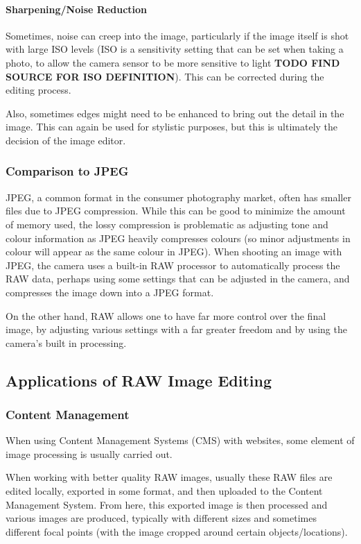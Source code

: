 \documentclass[12pt,a4paper]{article}
\begin{document}
\paragraph{Sharpening/Noise Reduction}
Sometimes, noise can creep into the image, particularly if the image itself is shot with large ISO levels (ISO is a sensitivity setting that can be
set when taking a photo, to allow the camera sensor to be more sensitive to light \textbf{TODO FIND SOURCE FOR ISO DEFINITION}). This can be corrected
during the editing process.

Also, sometimes edges might need to be enhanced to bring out the detail in the image. This can again be used for stylistic purposes, but this is ultimately the
decision of the image editor.

\subsubsection{Comparison to JPEG}
JPEG, a common format in the consumer photography market, often has smaller files due to JPEG compression.
While this can be good to minimize the amount of memory used, the lossy compression is problematic as adjusting tone
and colour information as JPEG heavily compresses colours (so minor adjustments in colour will appear as the same colour in JPEG).
When shooting an image with JPEG, the camera uses a built-in RAW processor to automatically process the RAW data, perhaps using some settings
that can be adjusted in the camera, and compresses the image down into a JPEG format.

On the other hand, RAW allows one to have far more control over the final image, by adjusting various settings with a far greater freedom and by using the camera's
built in processing.

\cite{UnderstandingRAWCapture}

\subsection{Applications of RAW Image Editing}
\subsubsection{Content Management}
When using Content Management Systems (CMS) with websites, some element of image processing is usually carried out.

When working with better quality RAW images, usually these RAW files are edited locally, exported in some format, and then
uploaded to the Content Management System. From here, this exported image is then processed and various images are produced,
typically with different sizes and sometimes different focal points (with the image cropped around certain objects/locations).
\end{document}
